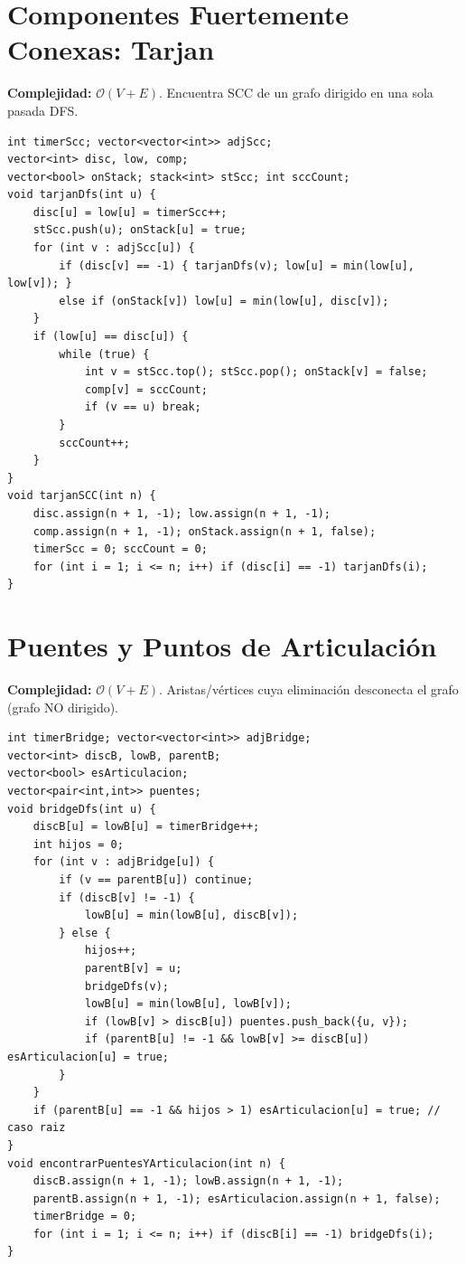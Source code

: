 \documentclass[10pt,twocolumn,letterpaper]{report}
\begin{document}
\section{Componentes Fuertemente Conexas: Tarjan}
\textbf{Complejidad:} $\mathcal{O}(V + E)$. Encuentra SCC de un grafo dirigido en una sola pasada DFS.
\begin{lstlisting}
int timerScc; vector<vector<int>> adjScc;
vector<int> disc, low, comp;
vector<bool> onStack; stack<int> stScc; int sccCount;
void tarjanDfs(int u) {
    disc[u] = low[u] = timerScc++;
    stScc.push(u); onStack[u] = true;
    for (int v : adjScc[u]) {
        if (disc[v] == -1) { tarjanDfs(v); low[u] = min(low[u], low[v]); }
        else if (onStack[v]) low[u] = min(low[u], disc[v]);
    }
    if (low[u] == disc[u]) {
        while (true) {
            int v = stScc.top(); stScc.pop(); onStack[v] = false;
            comp[v] = sccCount;
            if (v == u) break;
        }
        sccCount++;
    }
}
void tarjanSCC(int n) {
    disc.assign(n + 1, -1); low.assign(n + 1, -1);
    comp.assign(n + 1, -1); onStack.assign(n + 1, false);
    timerScc = 0; sccCount = 0;
    for (int i = 1; i <= n; i++) if (disc[i] == -1) tarjanDfs(i);
}
\end{lstlisting}

\section{Puentes y Puntos de Articulación}
\textbf{Complejidad:} $\mathcal{O}(V + E)$. Aristas/vértices cuya eliminación desconecta el grafo (grafo NO dirigido).
\begin{lstlisting}
int timerBridge; vector<vector<int>> adjBridge;
vector<int> discB, lowB, parentB;
vector<bool> esArticulacion;
vector<pair<int,int>> puentes;
void bridgeDfs(int u) {
    discB[u] = lowB[u] = timerBridge++;
    int hijos = 0;
    for (int v : adjBridge[u]) {
        if (v == parentB[u]) continue;
        if (discB[v] != -1) {
            lowB[u] = min(lowB[u], discB[v]);
        } else {
            hijos++;
            parentB[v] = u;
            bridgeDfs(v);
            lowB[u] = min(lowB[u], lowB[v]);
            if (lowB[v] > discB[u]) puentes.push_back({u, v});
            if (parentB[u] != -1 && lowB[v] >= discB[u]) esArticulacion[u] = true;
        }
    }
    if (parentB[u] == -1 && hijos > 1) esArticulacion[u] = true; // caso raiz
}
void encontrarPuentesYArticulacion(int n) {
    discB.assign(n + 1, -1); lowB.assign(n + 1, -1);
    parentB.assign(n + 1, -1); esArticulacion.assign(n + 1, false);
    timerBridge = 0;
    for (int i = 1; i <= n; i++) if (discB[i] == -1) bridgeDfs(i);
}
\end{lstlisting}
\end{document}
